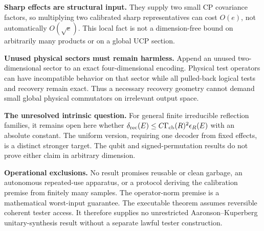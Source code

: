 \documentclass[11pt]{article}
\begin{document}
\textbf{Sharp effects are structural input.} They supply two small CP covariance
factors, so multiplying two calibrated sharp representatives can cost
\(O(e)\), not automatically \(O(\sqrt e)\). This local fact is not a
dimension-free bound on arbitrarily many products or on a global UCP section.

\textbf{Unused physical sectors must remain harmless.} Append an unused
two-dimensional sector to an exact four-dimensional encoding. Physical test
operators can have incompatible behavior on that sector while all pulled-back
logical tests and recovery remain exact. Thus a necessary recovery geometry
cannot demand small global physical commutators on irrelevant output space.

\textbf{The unresolved intrinsic question.} For general finite irreducible
reflection families, it remains open here whether
\(\delta_{\rm rec}(E)\le C\Gamma_{\rm cb}(R)^2\epsilon_R(E)\) with an
absolute constant. The uniform version, requiring one decoder from fixed
effects, is a distinct stronger target. The qubit and signed-permutation
results do not prove either claim in arbitrary dimension.

\textbf{Operational exclusions.} No result promises reusable or clean garbage,
an autonomous repeated-use apparatus, or a protocol deriving the calibration
premise from finitely many samples. The operator-norm premise is a mathematical
worst-input guarantee. The executable theorem assumes reversible coherent
tester access. It therefore supplies no unrestricted Aaronson--Kuperberg
unitary-synthesis result without a separate lawful tester construction.
\end{document}
